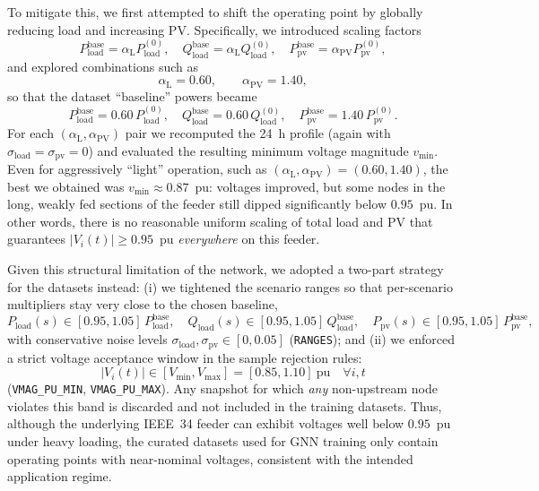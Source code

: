 \documentclass[11pt]{article}
\begin{document}
To mitigate this, we first attempted to shift the operating point by globally reducing load and increasing PV. Specifically, we introduced scaling factors
\[
P_{\mathrm{load}}^{\mathrm{base}} = \alpha_{\mathrm{L}} P_{\mathrm{load}}^{(0)}, \quad
Q_{\mathrm{load}}^{\mathrm{base}} = \alpha_{\mathrm{L}} Q_{\mathrm{load}}^{(0)}, \quad
P_{\mathrm{pv}}^{\mathrm{base}} = \alpha_{\mathrm{PV}} P_{\mathrm{pv}}^{(0)},
\]
and explored combinations such as
\[
\alpha_{\mathrm{L}} = 0.60, \qquad \alpha_{\mathrm{PV}} = 1.40,
\]
so that the dataset ``baseline'' powers became
\[
P_{\mathrm{load}}^{\mathrm{base}} = 0.60\, P_{\mathrm{load}}^{(0)}, \quad
Q_{\mathrm{load}}^{\mathrm{base}} = 0.60\, Q_{\mathrm{load}}^{(0)}, \quad
P_{\mathrm{pv}}^{\mathrm{base}} = 1.40\, P_{\mathrm{pv}}^{(0)}.
\]
For each $(\alpha_{\mathrm{L}}, \alpha_{\mathrm{PV}})$ pair we recomputed the 24~h profile (again with $\sigma_{\mathrm{load}}=\sigma_{\mathrm{pv}}=0$) and evaluated the resulting minimum voltage magnitude $v_{\min}$. Even for aggressively ``light'' operation, such as $(\alpha_{\mathrm{L}},\alpha_{\mathrm{PV}}) = (0.60,1.40)$, the best we obtained was $v_{\min} \approx 0.87$~pu: voltages improved, but some nodes in the long, weakly fed sections of the feeder still dipped significantly below $0.95$~pu. In other words, there is no reasonable uniform scaling of total load and PV that guarantees $|V_i(t)| \ge 0.95$~pu \emph{everywhere} on this feeder.

Given this structural limitation of the network, we adopted a two-part strategy for the datasets instead:
(i) we tightened the scenario ranges so that per-scenario multipliers stay very close to the chosen baseline,
\[
P_{\mathrm{load}}(s) \in [0.95,1.05]\,P_{\mathrm{load}}^{\mathrm{base}}, \quad
Q_{\mathrm{load}}(s) \in [0.95,1.05]\,Q_{\mathrm{load}}^{\mathrm{base}}, \quad
P_{\mathrm{pv}}(s) \in [0.95,1.05]\,P_{\mathrm{pv}}^{\mathrm{base}},
\]
with conservative noise levels $\sigma_{\mathrm{load}},\sigma_{\mathrm{pv}} \in [0,0.05]$ (\texttt{RANGES}); and
(ii) we enforced a strict voltage acceptance window in the sample rejection rules:
\[
|V_i(t)| \in [V_{\min}, V_{\max}] = [0.85,1.10]~\text{pu} \quad \forall i,t
\]
(\texttt{VMAG\_PU\_MIN}, \texttt{VMAG\_PU\_MAX}).
Any snapshot for which \emph{any} non-upstream node violates this band is discarded and not included in the training datasets. Thus, although the underlying IEEE~34 feeder can exhibit voltages well below $0.95$~pu under heavy loading, the curated datasets used for GNN training only contain operating points with near-nominal voltages, consistent with the intended application regime.
\end{document}
